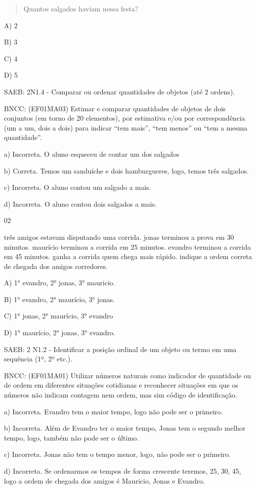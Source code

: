 \begin{itemize}
\begin{itemize}
\begin{quote}
Quantos salgados haviam nessa festa?
\end{quote}

A) 2

B) 3

C) 4

D) 5

SAEB: 2N1.4 - Comparar ou ordenar quantidades de objetos (até 2 ordens).

BNCC: (EF01MA03) Estimar e comparar quantidades de objetos de dois
conjuntos (em torno de 20 elementos), por estimativa e/ou por
correspondência (um a um, dois a dois) para indicar ``tem mais'', ``tem
menos'' ou ``tem a mesma quantidade''.

a) Incorreta. O aluno esqueceu de contar um dos salgados

b) Correta. Temos um sanduíche e dois hamburgueres, logo, temos três
salgados.

c) Incorreta. O aluno contou um salgado a mais.

d) Incorreta. O aluno contou dois salgados a mais.

\num{02}

três amigos estavam disputando uma corrida. jonas terminou a prova em 30
minutos. maurício terminou a corrida em 25 minutos. evandro terminou a
corrida em 45 minutos. ganha a corrida quem chega mais rápido. indique a
ordem correta de chegada dos amigos corredores.

A) 1° evandro, 2° jonas, 3° mauricio.

B) 1° evandro, 2° maurício, 3° jonas.

C) 1° jonas, 2° maurício, 3° evandro

D) 1° maurício, 2° jonas, 3° evandro.

SAEB: 2 N1.2 - Identificar a posição ordinal de um objeto ou termo em
uma sequência (1º, 2º etc.).

BNCC: (EF01MA01) Utilizar números naturais como indicador de quantidade
ou de ordem em diferentes situações cotidianas e reconhecer situações em
que os números não indicam contagem nem ordem, mas sim código de
identificação.

a) Incorreta. Evandro tem o maior tempo, logo não pode ser o primeiro.

b) Incorreta. Além de Evandro ter o maior tempo, Jonas tem o segundo
melhor tempo, logo, também não pode ser o último.

c) Incorreta. Jonas não tem o tempo menor, logo, não pode ser o
primeiro.

d) Incorreta. Se ordenarmos os tempos de forma crescente teremos, 25,
30, 45, logo a ordem de chegada dos amigos é Mauricio, Jonas e Evandro.


\end{itemize}
\end{itemize}
